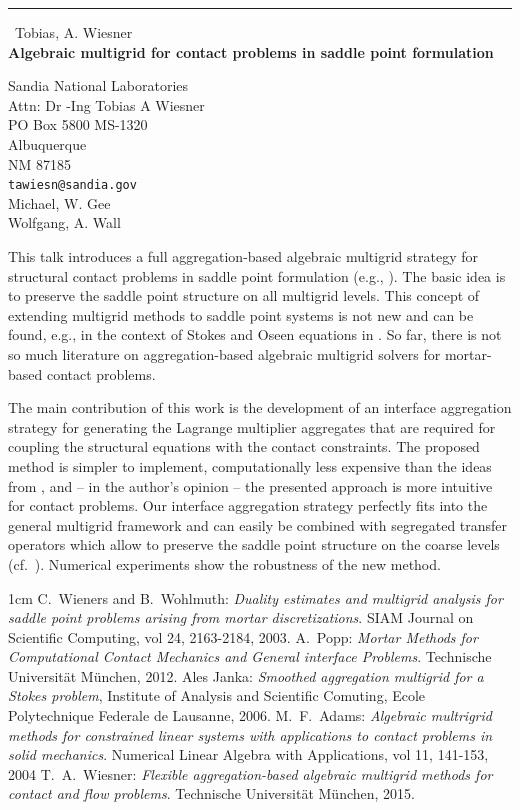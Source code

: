 \documentclass{report}
\begin{document}
\begin{center}
\rule{6in}{1pt} \
{\large Tobias, A. Wiesner \\
{\bf Algebraic multigrid for contact problems in saddle point formulation}}

Sandia National Laboratories \\ Attn: Dr -Ing Tobias A Wiesner \\ PO Box 5800 MS-1320 \\ Albuquerque \\ NM 87185
\\
{\tt tawiesn@sandia.gov}\\
Michael, W. Gee\\
Wolfgang, A. Wall\end{center}

This talk introduces a full aggregation-based algebraic multigrid
strategy for structural contact problems in saddle point formulation
(e.g., \cite{wieners2003,popp2012diss}). The basic idea is to preserve
the saddle point structure on all multigrid levels. This concept of
extending multigrid methods to saddle point systems is not new and can be
found, e.g., in the context of Stokes and Oseen equations in
\cite{janka2006}. So far, there is not so much literature on
aggregation-based algebraic multigrid solvers for mortar-based contact
problems.

The main contribution of this work is the development of an interface
aggregation strategy for generating the Lagrange multiplier aggregates
that are required for coupling the structural equations with the contact
constraints. The proposed method is simpler to implement, computationally
less expensive than the ideas from \cite{adams2004}, and -- in the
author's opinion -- the presented approach is more intuitive for contact
problems. Our interface aggregation strategy perfectly fits into the
general multigrid framework and can easily be combined with segregated
transfer operators which allow to preserve the saddle point structure on
the coarse levels (cf.~\cite{wiesner2014diss}). Numerical experiments
show the robustness of the new method.

\begin{thebibliography}{1cm}
C.~Wieners and B.~Wohlmuth: {\sl Duality estimates
and multigrid analysis for saddle point problems arising from mortar
discretizations}. SIAM Journal on Scientific Computing, vol 24,
2163-2184, 2003.
 A.~Popp: {\sl Mortar Methods for Computational
Contact Mechanics and General interface Problems}. Technische
Universit\"at M\"unchen, 2012.
 Ales Janka: {\sl Smoothed aggregation multigrid for a
{S}tokes problem}, Institute of Analysis and Scientific Comuting, Ecole
Polytechnique Federale de Lausanne, 2006.
 M.~F.~Adams: {\sl Algebraic multrigrid methods for
constrained linear systems with applications to contact problems in solid
mechanics}. Numerical Linear Algebra with Applications, vol 11, 141-153,
2004
 T.~A.~Wiesner: {\sl Flexible aggregation-based
algebraic multigrid methods for contact and flow problems}. Technische
Universit\"at M\"unchen, 2015.
\end{thebibliography}
\end{document}

